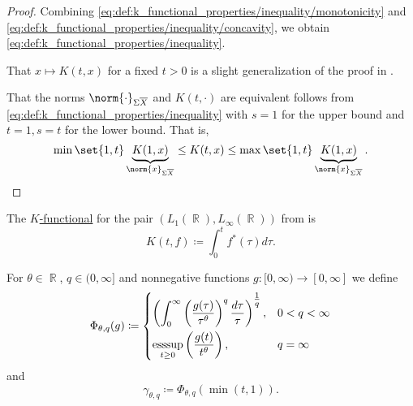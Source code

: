 \begin{proof}
  Combining \eqref{eq:def:k_functional_properties/inequality/monotonicity} and \eqref{eq:def:k_functional_properties/inequality/concavity}, we obtain \eqref{eq:def:k_functional_properties/inequality}.

   That \( x \mapsto K(t, x) \) for a fixed \( t > 0 \) is a slight generalization of the proof in .

  That the norms \( \norm{\cdot}_{\Sigma \oline{X}} \) and \( K(t, \cdot) \) are equivalent follows from \eqref{eq:def:k_functional_properties/inequality} with \( s = 1 \) for the upper bound and \( t = 1, s = t \) for the lower bound. That is,
  \begin{equation*}
    \min\set{1, t} \underbrace{K(1, x)}_{\norm{x}_{\Sigma \oline{X}}} \leq K(t, x) \leq \max\set{1, t} \underbrace{K(1, x)}_{\norm{x}_{\Sigma \oline{X}}}.
  \end{equation*}
\end{proof}

\begin{example}\label{thm:lp_interpolation_spaces/k_functional}
  The \hyperref[def:k_functional]{\( K \)-functional} for the pair \( (L_1(\BbbR), L_\infty(\BbbR)) \) from  is
  \begin{equation*}
    K(t, f) \coloneqq \int_0^t f^*(\tau) d\tau.
  \end{equation*}
\end{example}

\begin{definition}\label{def:lorenz_quasinorm}
  For \( \theta \in \BbbR \), \( q \in (0, \infty] \) and nonnegative functions \( g: [0, \infty) \to [0, \infty] \) we define
  \begin{equation}\label{eq:def:lorenz_quasinorm}
    \Phi_{\theta,q}(g) \coloneqq \begin{dcases}
      \left( \int_0^\infty \left( \frac {g(\tau)} {\tau^\theta} \right)^q \frac {d\tau} \tau \right)^{\tfrac 1 q}, &0 < q < \infty \\
      \operatorname*{ess\negthinspace\sup}_{t \geq 0} \left( \frac {g(t)} {t^\theta} \right),                                                &q = \infty
    \end{dcases}
  \end{equation}
  and
  \begin{equation}\label{eq:def:lorenz_quasinorm/gamma}
    \gamma_{\theta,q} \coloneqq \Phi_{\theta,q}(\min(t, 1)).
  \end{equation}
\end{definition}

